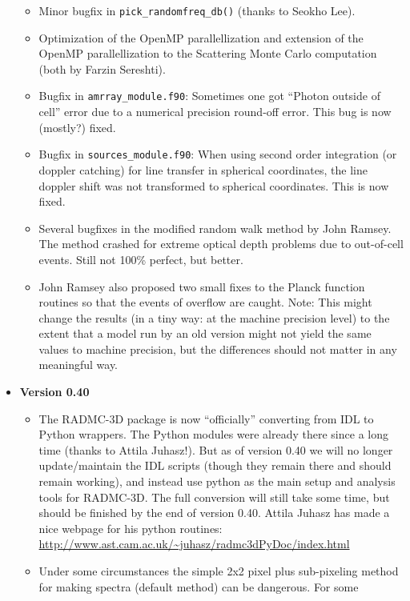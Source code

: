 \documentclass{report}
\begin{document}
\begin{itemize}
\begin{itemize}
  \item Minor bugfix in {\small\tt pick\_randomfreq\_db()} (thanks to Seokho Lee).
  \item Optimization of the OpenMP parallellization and extension of the
    OpenMP parallellization to the Scattering Monte Carlo computation (both
    by Farzin Sereshti).
  \item Bugfix in {\small\tt amrray\_module.f90}: Sometimes one got ``Photon
    outside of cell'' error due to a numerical precision round-off
    error. This bug is now (mostly?) fixed.
  \item Bugfix in {\small\tt sources\_module.f90}: When using second order
    integration (or doppler catching) for line transfer in spherical
    coordinates, the line doppler shift was not transformed to spherical
    coordinates. This is now fixed.
  \item Several bugfixes in the modified random walk method by 
    John Ramsey. The method crashed for extreme optical depth problems
    due to out-of-cell events. Still not 100\% perfect, but better.
  \item John Ramsey also proposed two small fixes to the Planck function
    routines so that the events of overflow are caught. Note: This might
    change the results (in a tiny way: at the machine precision level) to
    the extent that a model run by an old version might not yield the same
    values to machine precision, but the differences should not matter in
    any meaningful way.
  \end{itemize}
\item {\bf Version 0.40}\\
  \begin{itemize}
  \item The RADMC-3D package is now ``officially'' converting from IDL to
    Python wrappers. The Python modules were already there since a long time
    (thanks to Attila Juhasz!). But as of version 0.40 we will no longer
    update/maintain the IDL scripts (though they remain there and should
    remain working), and instead use python as the main setup and analysis
    tools for RADMC-3D. The full conversion will still take some time, but
    should be finished by the end of version 0.40. Attila Juhasz has made
    a nice webpage for his python routines:\\
    \url{http://www.ast.cam.ac.uk/~juhasz/radmc3dPyDoc/index.html}
  \item Under some circumstances the simple 2x2 pixel plus sub-pixeling
    method for making spectra (default method) can be dangerous. For some

\end{itemize}
\end{itemize}
\end{document}
